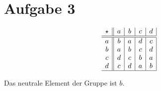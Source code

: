 \documentclass[12pt,a4paper]{article}
\begin{document}
\section*{Aufgabe 3}

\[
\begin{array}{c||c|c|c|c|}
\star & a & b & c & d\\
\hline\hline
a & b & a & d & c\\
b & a & b & c & d\\
c & d & c & b & a\\
d & c & d & a & b\\
\hline
\end{array}
\]

Das neutrale Element der Gruppe ist $b$.


\end{document}
